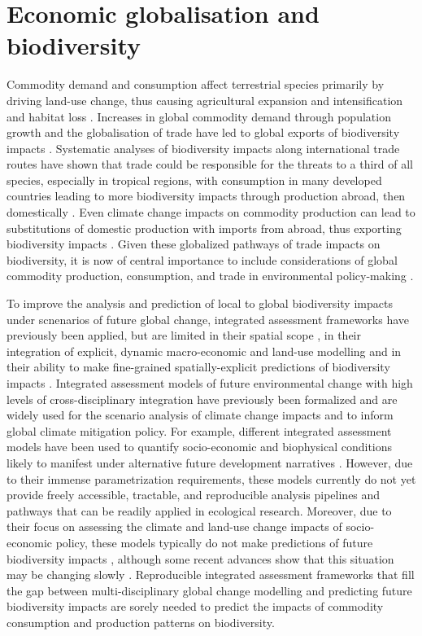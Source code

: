 \section{Economic globalisation and biodiversity}
Commodity demand and consumption affect terrestrial species primarily by driving land-use change, thus causing agricultural expansion and intensification and habitat loss \citep{lambin_global_2011}. Increases in global commodity demand through population growth and the globalisation of trade have led to global exports of biodiversity impacts \citep{marques_increasing_2019, newbold_trouble_2019, kapitza_assessing_2021}. Systematic analyses of biodiversity impacts along international trade routes have shown that trade could be responsible for the threats to a third of all species, especially in tropical regions, with consumption in many developed countries leading to more biodiversity impacts through production abroad, then domestically \citep{lenzen_international_2012, marques_increasing_2019}. Even climate change impacts on commodity production can lead to substitutions of domestic production with imports from abroad, thus exporting biodiversity impacts \citep{kapitza_assessing_2021}. Given these globalized pathways of trade impacts on biodiversity, it is now of central importance to include considerations of global commodity production, consumption, and trade in environmental policy-making \citep{marques_increasing_2019}. 

To improve the analysis and prediction of local to global biodiversity impacts under scnenarios of future global change, integrated assessment frameworks have previously been applied, but are limited in their spatial scope \citep{kapitza_assessing_2021}, in their integration of explicit, dynamic macro-economic and land-use modelling \citep{newbold_future_2018} and in their ability to make fine-grained spatially-explicit predictions of biodiversity impacts \citep{leclere_bending_2020}. Integrated assessment models of future environmental change with high levels of cross-disciplinary integration have previously been formalized and are widely used for the scenario analysis of climate change impacts and to inform global climate mitigation policy. For example, different integrated assessment models have been used to quantify socio-economic and biophysical conditions likely to manifest under alternative future development narratives \citep{riahi_shared_2017}. However, due to their immense parametrization requirements, these models currently do not yet provide freely accessible, tractable, and reproducible analysis pipelines and pathways that can be readily applied in ecological research. Moreover, due to their focus on assessing the climate and land-use change impacts of socio-economic policy, these models typically do not make predictions of future biodiversity impacts \citep{hauck_reviewing_2015}, although some recent advances show that this situation may be changing slowly \citep{veerkamp_future_2020}. Reproducible integrated assessment frameworks that fill the gap between multi-disciplinary global change modelling and predicting future biodiversity impacts are sorely needed to predict the impacts of commodity consumption and production patterns on biodiversity.


